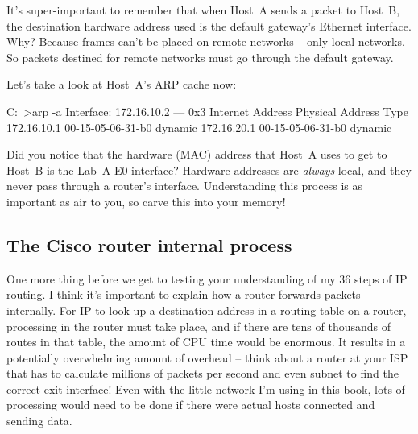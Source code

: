 It's super-important to remember that when Host~A sends a packet to
Host~B, the destination hardware address used is the default gateway's
Ethernet interface. Why? Because frames can't be placed on remote
networks -- only local networks. So packets destined for remote networks
must go through the default gateway.

Let's take a look at Host~A's ARP cache now:

\begin{cli}
C:\ >arp -a
Interface: 172.16.10.2 --- 0x3
  Internet Address      Physical Address      Type
  172.16.10.1           00-15-05-06-31-b0     dynamic
  172.16.20.1           00-15-05-06-31-b0     dynamic
\end{cli}

Did you notice that the hardware (MAC) address that Host~A uses to get
to Host~B is the Lab~A E0 interface? Hardware addresses are
\emph{always} local, and they never pass through a router's interface.
Understanding this process is as important as air to you, so carve this
into your memory!

\subsection{The Cisco router internal process}

One more thing before we get to testing your understanding of my 36 steps of IP routing.
I think it's important to explain how a router forwards packets internally.
For IP to look up a destination address in a routing table on a router, processing in the router must take place,
and if there are tens of thousands of routes in that table, the amount of CPU time would be enormous.
It results in a potentially overwhelming amount of overhead --
think about a router at your ISP that has to calculate millions of packets per second and even subnet to find the correct exit interface!
Even with the little network I'm using in this book, lots of processing would need to be done if there were actual hosts connected and sending data.

